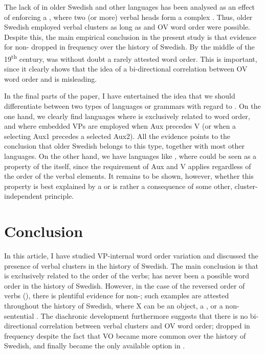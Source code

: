 \documentclass[output=paper, colorlinks, citecolor=brown]{langscibook}
\begin{document}
The lack of  in older Swedish and other languages has been analysed as an effect of  enforcing a , where two (or more) verbal heads form a complex . Thus, older Swedish employed verbal clusters as long as  and OV word order were possible. Despite this, the main empirical conclusion in the present study is that evidence for non- dropped in frequency over the history of Swedish. By the middle of the 19\textsuperscript{th} century,  was without doubt a rarely attested word order. This is important, since it clearly shows that the idea of a bi-directional correlation between OV word order and  is misleading.



In the final parts of the paper, I have entertained the idea that we should differentiate between two types of languages or grammars with regard to . On the one hand, we clearly find languages where  is exclusively related to  word order, and where embedded VPs are employed when Aux precedes V (or when a selecting  Aux1 precedes a selected  Aux2). All the evidence points to the conclusion that older Swedish belongs to this type, together with most other  languages. On the other hand, we have languages like , where  could be seen as a property of the  itself, since the  requirement of Aux and V applies regardless of the order of the verbal elements. It remains to be shown, however, whether this property is best explained by a  or is rather a consequence of some other, cluster-independent principle.


\section{Conclusion}\label{sec:sangfelt:6}

In this article, I have studied VP-internal word order variation and discussed the presence of verbal clusters in the history of Swedish. The main conclusion is that  is exclusively related to the order of the verbs;  has never been a possible word order in the history of Swedish. However, in the case of the reversed order of verbs (), there is plentiful evidence for non-; such examples are attested throughout the history of Swedish, where X can be an object, a , or a non-sentential . The diachronic development furthermore suggests that there is no bi-directional correlation between verbal clusters and OV word order;  dropped in frequency despite the fact that VO became more common over the history of Swedish, and finally became the only available option in .
\end{document}
